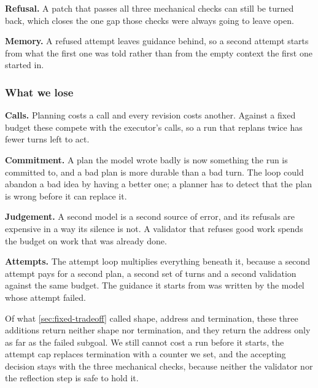 \item \textbf{Refusal.} A patch that passes all three mechanical checks can still be turned back,
which closes the one gap those checks were always going to leave open.

\item \textbf{Memory.} A refused attempt leaves guidance behind, so a second attempt starts from
what the first one was told rather than from the empty context the first one started in.

\ei

\subsubsection{What we lose}

\bi

\item \textbf{Calls.} Planning costs a call and every revision costs another. Against a fixed budget
these compete with the executor's calls, so a run that replans twice has fewer turns left to act.

\item \textbf{Commitment.} A plan the model wrote badly is now something the run is committed to,
and a bad plan is more durable than a bad turn. The loop could abandon a bad idea by having a
better one; a planner has to detect that the plan is wrong before it can replace it.

\item \textbf{Judgement.} A second model is a second source of error, and its refusals are
expensive in a way its silence is not. A validator that refuses good work spends the budget on work
that was already done.

\item \textbf{Attempts.} The attempt loop multiplies everything beneath it, because a second attempt
pays for a second plan, a second set of turns and a second validation against the same budget. The
guidance it starts from was written by the model whose attempt failed.

\ei

Of what \cref{sec:fixed-tradeoff} called shape, address and termination, these three additions
return neither shape nor termination, and they return the address only as far as the failed
subgoal. We still cannot cost a run before it starts, the attempt cap replaces termination with a
counter we set, and the accepting decision stays with the three mechanical checks, because neither
the validator nor the reflection step is safe to hold it.

